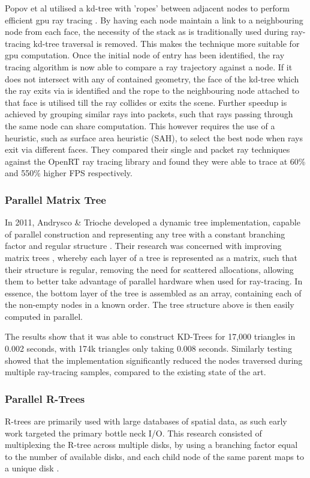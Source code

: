       Popov et al utilised a kd-tree with 'ropes' between adjacent nodes to perform efficient \gls{gpu} ray tracing \cite{PG*07}. By having each node maintain a link to a neighbouring node from each face, the necessity of the stack as is traditionally used during ray-tracing kd-tree traversal is removed. This makes the technique more suitable for \gls{gpu} computation. Once the initial node of entry has been identified, the ray tracing algorithm is now able to compare a ray trajectory against a node. If it does not intersect with any of contained geometry, the face of the kd-tree which the ray exits via is identified and the rope to the neighbouring node attached to that face is utilised till the ray collides or exits the scene. Further speedup is achieved by grouping similar rays into packets, such that rays passing through the same node can share computation. This however requires the use of a heuristic, such as surface area heuristic (SAH), to select the best node when rays exit via different faces. They compared their single and packet ray techniques against the OpenRT ray tracing library and found they were able to trace at 60\% and 550\% higher FPS respectively.
      
    \subsubsection*{Parallel Matrix Tree}
      In 2011, Andrysco \& Trioche developed a dynamic tree implementation, capable of parallel construction and representing any tree with a constant branching factor and regular structure \cite{AT11}. 
      Their research was concerned with improving matrix trees \cite{AT10}, whereby each layer of a tree is represented as a matrix, such that their structure is regular, removing the need for scattered allocations, allowing them to better take advantage of parallel hardware when used for ray-tracing. In essence, the bottom layer of the tree is assembled as an array, containing each of the non-empty nodes in a known order. The tree structure above is then easily computed in parallel.
      
      The results show that it was able to construct KD-Trees for 17,000 triangles in 0.002 seconds, with 174k triangles only taking 0.008 seconds. Similarly testing showed that the implementation significantly reduced the nodes traversed during multiple ray-tracing samples, compared to the existing state of the art.%
    \subsubsection*{Parallel R-Trees}
      R-trees are primarily used with large databases of spatial data, as such early work targeted the primary bottle neck I/O. This research consisted of multiplexing the R-tree across multiple disks, by using a branching factor equal to the number of available disks, and each child node of the same parent maps to a unique disk \cite{KF92}.
      
